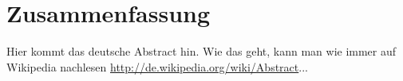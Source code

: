 \chapter{Zusammenfassung}
\label{cha:zusammenfassung}

Hier kommt das deutsche Abstract hin. Wie das geht, kann man wie immer auf Wikipedia nachlesen \url{http://de.wikipedia.org/wiki/Abstract}...